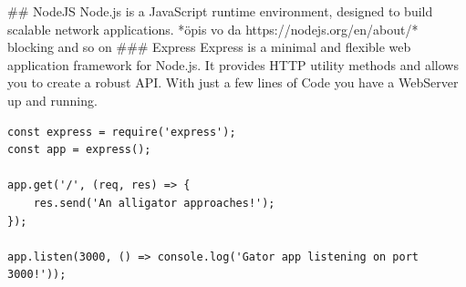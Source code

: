 \begin{markdown}
## NodeJS
Node.js is a JavaScript runtime environment, designed to build scalable network applications\cite{Node}.
*öpis vo da https://nodejs.org/en/about/* blocking and so on
### Express
Express\cite{Express} is a minimal and flexible web application framework for Node.js. It provides HTTP utility methods and allows you to create a robust API.
With just a few lines of Code you have a WebServer up and running.

\begin{lstlisting}
const express = require('express');
const app = express();

app.get('/', (req, res) => {
    res.send('An alligator approaches!');
});

app.listen(3000, () => console.log('Gator app listening on port 3000!'));
\end{lstlisting}

\end{markdown}
